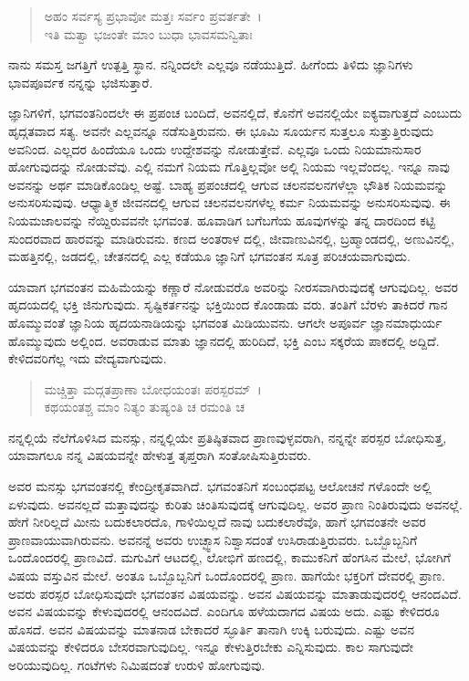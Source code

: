 \begin{verse}
ಅಹಂ ಸರ್ವಸ್ಯ ಪ್ರಭಾವೋ ಮತ್ತಃ ಸರ್ವಂ ಪ್ರವರ್ತತೇ~।\\ಇತಿ ಮತ್ವಾ ಭಜಂತೇ ಮಾಂ ಬುಧಾ ಭಾವಸಮನ್ವಿತಾಃ 
\end{verse}

{\small ನಾನು ಸಮಸ್ತ ಜಗತ್ತಿಗೆ ಉತ್ಪತ್ತಿ ಸ್ಥಾನ. ನನ್ನಿಂದಲೇ ಎಲ್ಲವೂ ನಡೆಯುತ್ತಿದೆ. ಹೀಗೆಂದು ತಿಳಿದು ಜ್ಞಾನಿಗಳು ಭಾವಪೂರ್ವಕ ನನ್ನನ್ನು ಭಜಿಸುತ್ತಾರೆ.}

ಜ್ಞಾನಿಗಳಿಗೆ, ಭಗವಂತನಿಂದಲೇ ಈ ಪ್ರಪಂಚ ಬಂದಿದೆ, ಅವನಲ್ಲಿದೆ, ಕೊನೆಗೆ ಅವನಲ್ಲಿಯೇ ಐಕ್ಯವಾಗುತ್ತದೆ ಎಂಬುದು ಹೃದ್ಗತವಾದ ಸತ್ಯ. ಅವನೇ ಎಲ್ಲವನ್ನೂ ನಡೆಸುತ್ತಿರುವನು. ಈ ಭೂಮಿ ಸೂರ್ಯನ ಸುತ್ತಲೂ ಸುತ್ತುತ್ತಿರುವುದು ಅವನಿಂದ. ಎಲ್ಲದರ ಹಿಂದೆಯೂ ಒಂದು ಉದ್ದೇಶವನ್ನು ನೋಡುತ್ತೇವೆ. ಎಲ್ಲವೂ ಒಂದು ನಿಯಮಾನುಸಾರ ಹೋಗುವುದನ್ನು ನೋಡುವೆವು. ಎಲ್ಲಿ ನಮಗೆ ನಿಯಮ ಗೊತ್ತಿಲ್ಲವೋ ಅಲ್ಲಿ ನಿಯಮ ಇಲ್ಲವೆಂದಲ್ಲ. ಇನ್ನೂ ನಾವು ಅವನನ್ನು ಅರ್ಥ ಮಾಡಿಕೊಂಡಿಲ್ಲ ಅಷ್ಟೆ. ಬಾಹ್ಯ ಪ್ರಪಂಚದಲ್ಲಿ ಆಗುವ ಚಲನವಲನಗಳೆಲ್ಲಾ ಭೌತಿಕ ನಿಯಮವನ್ನು ಅನುಸರಿಸುವುವು. ಆಧ್ಯಾತ್ಮಿಕ ಜೀವನದಲ್ಲಿ ಆಗುವ ಚಲನವಲನಗಳೆಲ್ಲ ಕರ್ಮ ನಿಯಮವನ್ನು ಅನುಸರಿಸುವುವು. ಈ ನಿಯಮಜಾಲವನ್ನು ನೆಯ್ದಿರುವವನೇ ಭಗವಂತ. ಹೂವಾಡಿಗ ಬಗೆಬಗೆಯ ಹೂವುಗಳನ್ನು ತನ್ನ ದಾರದಿಂದ ಕಟ್ಟಿ ಸುಂದರವಾದ ಹಾರವನ್ನು ಮಾಡಿರುವನು. ಕಣದ ಅಂತರಾಳ ದಲ್ಲಿ, ಜೀವಾಣುವಿನಲ್ಲಿ, ಬ್ರಹ್ಮಾಂಡದಲ್ಲಿ, ಅಣುವಿನಲ್ಲಿ, ಮಹತ್ತಿನಲ್ಲಿ, ಜಡದಲ್ಲಿ, ಚೇತನದಲ್ಲಿ ಎಲ್ಲ ಕಡೆಯೂ ಜ್ಞಾನಿಗೆ ಭಗವಂತನ ಸೂತ್ರ ಪರಿಚಯವಾಗುವುದು.

ಯಾವಾಗ ಭಗವಂತನ ಮಹಿಮೆಯನ್ನು ಕಣ್ಣಾರೆ ನೋಡುವರೊ ಅವರಿನ್ನು ನೀರಸವಾಗಿರುವುದಕ್ಕೆ ಆಗುವುದಿಲ್ಲ. ಅವರ ಹೃದಯದಲ್ಲಿ ಭಕ್ತಿ ಜಿನುಗುವುದು. ಸೃಷ್ಟಿಕರ್ತನನ್ನು ಭಕ್ತಿಯಿಂದ ಕೊಂಡಾಡು ವರು. ತಂತಿಗೆ ಬೆರಳು ತಾಕಿದರೆ ಗಾನ ಹೊಮ್ಮುವಂತೆ ಜ್ಞಾನಿಯ ಹೃದಯನಾಡಿಯನ್ನು ಭಗವಂತ ಮಿಡಿಯುವನು. ಆಗಲೇ ಅಪೂರ್ವ ಜ್ಞಾನಮಾಧುರ್ಯ ಹೊಮ್ಮುವುದು ಅಲ್ಲಿಂದ. ಅವರಾಡುವ ಮಾತು ಜ್ಞಾನದಲ್ಲಿ ಹುರಿದಿದೆ, ಭಕ್ತಿ ಎಂಬ ಸಕ್ಕರೆಯ ಪಾಕದಲ್ಲಿ ಅದ್ದಿದೆ. ಕೇಳಿದವರಿಗೆಲ್ಲ ಇದು ವೇದ್ಯವಾಗುವುದು.

\begin{verse}
ಮಚ್ಚಿತ್ತಾ ಮದ್ಗತಪ್ರಾಣಾ ಬೋಧಯಂತಃ ಪರಸ್ಪರಮ್​~।\\ಕಥಯಂತಶ್ಚ ಮಾಂ ನಿತ್ಯಂ ತುಷ್ಯಂತಿ ಚ ರಮಂತಿ ಚ 
\end{verse}

{\small ನನ್ನಲ್ಲಿಯೆ ನೆಲೆಗೊಳಿಸಿದ ಮನಸ್ಸು, ನನ್ನಲ್ಲಿಯೇ ಪ್ರತಿಷ್ಠಿತವಾದ ಪ್ರಾಣವುಳ್ಳವರಾಗಿ, ನನ್ನನ್ನೇ ಪರಸ್ಪರ ಬೋಧಿಸುತ್ತ, ಯಾವಾಗಲೂ ನನ್ನ ವಿಷಯವನ್ನೇ ಹೇಳುತ್ತ ತೃಪ್ತರಾಗಿ ಸಂತೋಷಿಸುತ್ತಿರುವರು.}

ಅವರ ಮನಸ್ಸು ಭಗವಂತನಲ್ಲಿ ಕೇಂದ್ರೀಕೃತವಾಗಿದೆ. ಭಗವಂತನಿಗೆ ಸಂಬಂಧಪಟ್ಟ ಆಲೋಚನೆ ಗಳೊಂದೇ ಅಲ್ಲಿ ಏಳುವುದು. ಅವನಲ್ಲದೆ ಮತ್ತಾವುದನ್ನು ಕುರಿತು ಚಿಂತಿಸುವುದಕ್ಕೆ ಆಗುವುದಿಲ್ಲ. ಅವರ ಪ್ರಾಣ ನಿಂತಿರುವುದು ಅವನಲ್ಲೆ. ಹೇಗೆ ನೀರಿಲ್ಲದೆ ಮೀನು ಬದುಕಲಾರದೊ, ಗಾಳಿಯಿಲ್ಲದೆ ನಾವು ಬದುಕಲಾರೆವೊ, ಹಾಗೆ ಭಗವಂತನೇ ಅವರ ಪ್ರಾಣವಾಯುವಾಗಿರುವನು. ಅವನನ್ನೆ ಅವರು ಉಚ್ಛ್ವಾಸ ನಿಶ್ವಾಸದಂತೆ ಉಸಿರಾಡುತ್ತಿರುವರು. ಒಬ್ಬೊಬ್ಬನಿಗೆ ಒಂದೊಂದರಲ್ಲಿ ಪ್ರಾಣವಿದೆ. ಮಗುವಿಗೆ ಆಟದಲ್ಲಿ, ಲೋಭಿಗೆ ಹಣದಲ್ಲಿ, ಕಾಮುಕನಿಗೆ ಹೆಂಗಸಿನ ಮೇಲೆ, ಭೋಗಿಗೆ ವಿಷಯ ವಸ್ತುವಿನ ಮೇಲೆ. ಅಂತೂ ಒಬ್ಬೊಬ್ಬನಿಗೆ ಒಂದೊಂದರಲ್ಲಿ ಪ್ರಾಣ. ಹಾಗೆಯೇ ಭಕ್ತರಿಗೆ ದೇವರಲ್ಲಿ ಪ್ರಾಣ. ಅವರು ಪರಸ್ಪರ ಬೋಧಿಸುವುದೇ ಭಗವಂತನ ವಿಷಯವನ್ನು. ಅವನ ವಿಷಯವನ್ನು ಮಾತಾಡುವುದರಲ್ಲಿ ಆನಂದವಿದೆ. ಅವನ ವಿಷಯವನ್ನು ಕೇಳುವುದರಲ್ಲಿ ಆನಂದವಿದೆ. ಎಂದಿಗೂ ಹಳೆಯದಾಗದ ವಿಷಯ ಅದು. ಎಷ್ಟು ಕೇಳಿದರೂ ಹೊಸದೆ. ಅವನ ವಿಷಯವನ್ನು ಮಾತನಾಡ ಬೇಕಾದರೆ ಸ್ಫೂರ್ತಿ ತಾನಾಗಿ ಉಕ್ಕಿ ಬರುವುದು. ಎಷ್ಟು ಅವನ ವಿಷಯವನ್ನು ಕೇಳಿದರೂ ಬೇಸರವಾಗುವುದಿಲ್ಲ. ಇನ್ನೂ ಕೇಳುತ್ತಿರಬೇಕು ಎನ್ನಿಸುವುದು. ಕಾಲ ಸಾಗುವುದೇ ಅರಿಯುವುದಿಲ್ಲ. ಗಂಟೆಗಳು ನಿಮಿಷದಂತೆ ಉರುಳಿ ಹೋಗುವುವು.

